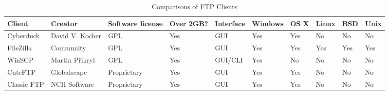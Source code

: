 \documentclass[9pt,twocolumn,twoside]{styles/osajnl}
\begin{document}
\begin{table}[hbt]
\centering

\label{my-label}
\begin{tabular}{|l|l|l|l|l|l|l|l|l|l|}
\hline
\rowcolor[HTML]{D9F4F4} 
\textbf{Client} & \textbf{Creator}         & \textbf{Software license} & \textbf{Over 2GB?} & \textbf{Interface} & \textbf{Windows} & \textbf{OS X} & \textbf{Linux} & \textbf{BSD} & \textbf{Unix} \\ \hline
Cyberduck       & David V. Kocher          & GPL                       & Yes                & GUI                & Yes              & Yes           & No             & No           & No            \\ \hline
FileZilla       & Community                & GPL                       & Yes                & GUI                & Yes              & Yes           & Yes            & Yes          & Yes           \\ \hline
WinSCP          & Martin Přikryl           & GPL                       & Yes                & GUI/CLI            & Yes              & No            & No             & No           & No            \\ \hline
CuteFTP         &Globalscape & Proprietary               & Yes                & GUI                & Yes              & Yes           & No             & No           & No            \\ \hline
Classic FTP     & NCH Software             & Proprietary               & Yes                & GUI                & Yes              & Yes           & No             & No           & No            \\ \hline
\end{tabular}
\caption{Comparisons of FTP Clients}
\end{table}
\end{document}
